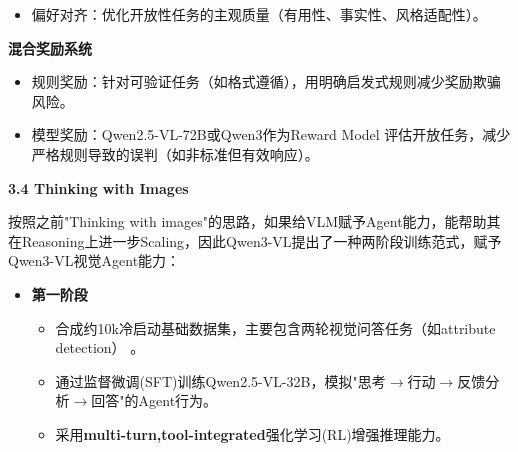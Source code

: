 \documentclass[zihao=false,fontset=windows]{ctexart}
\begin{document}
\begin{itemize}[label=\textcolor{feishuBlue}{\textbullet}]
\item 偏好对齐：优化开放性任务的主观质量（有用性、事实性、风格适配性）。

\end{itemize}

\textbf{混合奖励系统}\par

\begin{itemize}[label=\textcolor{feishuBlue}{\textbullet}]
\item 规则奖励：针对可验证任务（如格式遵循），用明确启发式规则减少奖励欺骗风险。

\end{itemize}

\begin{itemize}[label=\textcolor{feishuBlue}{\textbullet}]
\item 模型奖励：\textcolor{feishuRed}{Qwen2.5-VL-72B或Qwen3作为Reward Model }评估开放任务，减少严格规则导致的误判（如非标准但有效响应）。

\end{itemize}


\Needspace{2cm}\par\vspace{0.9em}\begin{tcolorbox}[enhanced,colback=headOrange,boxrule=0pt,arc=4pt,boxsep=0pt,left=3pt,right=3pt,top=2pt,bottom=2pt,before skip=0pt,after skip=3pt]\bfseries \textcolor{feishuBlue}{3.4} Thinking with Images\end{tcolorbox}

按照之前"Thinking with images"的思路，如果给VLM赋予Agent能力，能帮助其在Reasoning上进一步Scaling，因此Qwen3-VL提出了一种两阶段训练范式，赋予Qwen3-VL视觉Agent能力：\par

\begin{itemize}[label=\textcolor{feishuBlue}{1.}]
\item \textbf{第一阶段}
\begin{itemize}[label=\textcolor{feishuBlue}{\textbullet}]
\item 合成约10k冷启动基础数据集，主要包含两轮视觉问答任务（如attribute detection） 。

\end{itemize}

\begin{itemize}[label=\textcolor{feishuBlue}{\textbullet}]
\item 通过监督微调(SFT)训练Qwen2.5-VL-32B，模拟"思考$\rightarrow$行动$\rightarrow$反馈分析$\rightarrow$回答"的Agent行为。

\end{itemize}

\begin{itemize}[label=\textcolor{feishuBlue}{\textbullet}]
\item 采用\textcolor{feishuRed}{\textbf{multi-turn,tool-integrated}}强化学习(RL)增强推理能力。

\end{itemize}

\end{itemize}
\end{document}
